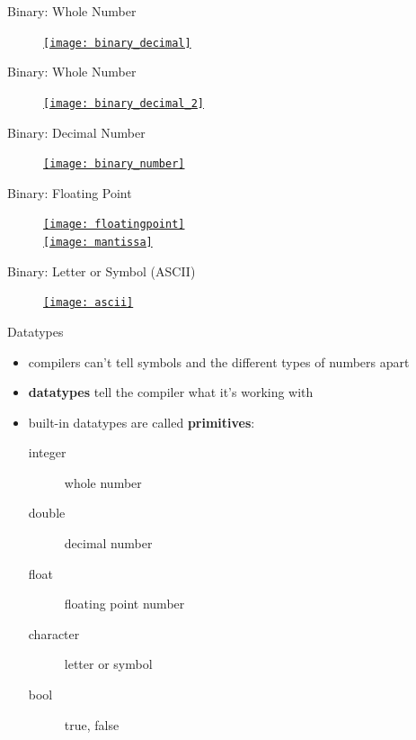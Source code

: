 \documentclass[xcolor={dvipsnames}]{beamer}
\begin{document}
\begin{frame}{Binary: Whole Number}
	\begin{figure}
		\href{http://www.wikihow.com/Convert-from-Binary-to-Decimal}{\texttt{[image: binary\_decimal]}}
	\end{figure}
\end{frame}

\begin{frame}{Binary: Whole Number}
	\begin{figure}
		\href{http://www.wikihow.com/Convert-from-Binary-to-Decimal}{\texttt{[image: binary\_decimal\_2]}}
	\end{figure}
\end{frame}

\begin{frame}{Binary: Decimal Number}
	\begin{figure}
		\href{http://www.mathsisfun.com/binary-number-system.html}{\texttt{[image: binary\_number]}}
	\end{figure}
\end{frame}

\begin{frame}{Binary: Floating Point}
	\begin{figure}
	\href{http://www.teach-ict.com/as_as_computing/ocr/H447/F453/3_3_4/floating_point/miniweb/pg6.htm}{\texttt{[image: floatingpoint]}}\\			\href{http://www.teach-ict.com/as_as_computing/ocr/H447/F453/3_3_4/floating_point/miniweb/pg6.htm}{\texttt{[image: mantissa]}}
	\end{figure}
\end{frame}

\begin{frame}{Binary: Letter or Symbol (ASCII)}
	\begin{figure}
		\href{https://commons.wikimedia.org/wiki/File:ASCII-Table.svg}{\texttt{[image: ascii]}}
	\end{figure}
\end{frame}

\begin{frame}{Datatypes}
	\begin{itemize}
		\item compilers can't tell symbols and the different types of numbers apart
			\pause
		\item \textbf{datatypes} tell the compiler what it's working with
			\pause
		\item built-in datatypes are called \textbf{primitives}:
			\pause
			\begin{description}
				\item [integer] whole number
				\item [double] decimal number
				\item [float] floating point number
				\item [character] letter or symbol
				\item [bool] true, false
			\end{description}
	\end{itemize}
\end{frame}
\end{document}
